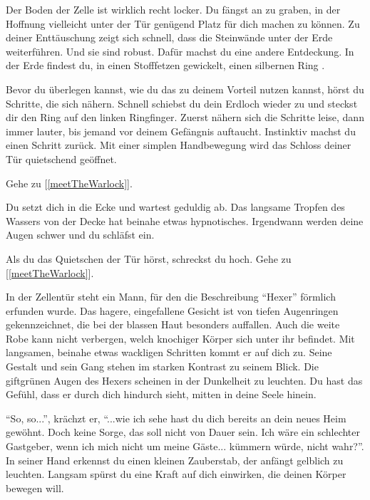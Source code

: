 Der Boden der Zelle ist wirklich recht locker. Du fängst an zu graben, in der Hoffnung vielleicht unter der Tür genügend Platz für dich machen zu können. Zu deiner Enttäuschung zeigt sich schnell, dass die Steinwände unter der Erde weiterführen. Und sie sind robust. Dafür machst du eine andere Entdeckung. In der Erde findest du, in einen Stofffetzen gewickelt, einen silbernen Ring .

Bevor du überlegen kannst, wie du das zu deinem Vorteil nutzen kannst, hörst du Schritte, die sich nähern. Schnell schiebst du dein Erdloch wieder zu und steckst dir den Ring auf den linken Ringfinger. Zuerst nähern sich die Schritte leise, dann immer lauter, bis jemand vor deinem Gefängnis auftaucht. Instinktiv machst du einen Schritt zurück. Mit einer simplen Handbewegung wird das Schloss deiner Tür quietschend geöffnet.

Gehe zu [\ref{meetTheWarlock}].


Du setzt dich in die Ecke und wartest geduldig ab. Das langsame Tropfen des Wassers von der Decke hat beinahe etwas hypnotisches. Irgendwann werden deine Augen schwer und du schläfst ein.

Als du das Quietschen der Tür hörst, schreckst du hoch. Gehe zu [\ref{meetTheWarlock}].


In der Zellentür steht ein Mann, für den die Beschreibung ``Hexer'' förmlich erfunden wurde. Das hagere, eingefallene Gesicht ist von tiefen Augenringen gekennzeichnet, die bei der blassen Haut besonders auffallen. Auch die weite Robe kann nicht verbergen, welch knochiger Körper sich unter ihr befindet. Mit langsamen, beinahe etwas wackligen Schritten kommt er auf dich zu. Seine Gestalt und sein Gang stehen im starken Kontrast zu seinem Blick. Die giftgrünen Augen des Hexers scheinen in der Dunkelheit zu leuchten. Du hast das Gefühl, dass er durch dich hindurch sieht, mitten in deine Seele hinein.

``So, so...'', krächzt er, ``...wie ich sehe hast du dich bereits an dein neues Heim gewöhnt. Doch keine Sorge, das soll nicht von Dauer sein. Ich wäre ein schlechter Gastgeber, wenn ich mich nicht um meine Gäste... kümmern würde, nicht wahr?''. In seiner Hand erkennst du einen kleinen Zauberstab, der anfängt gelblich zu leuchten. Langsam spürst du eine Kraft auf dich einwirken, die deinen Körper bewegen will.

